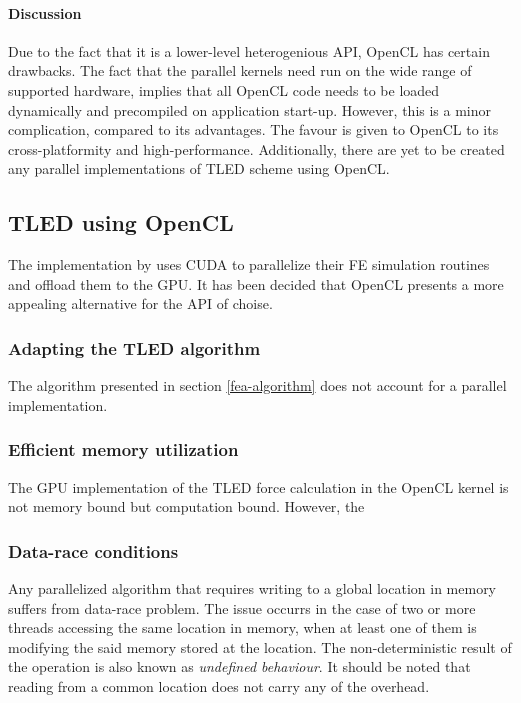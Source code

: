  \paragraph{Discussion} Due to the fact that it is a lower-level heterogenious API, OpenCL has certain drawbacks. The fact that the parallel kernels need run on the wide range of supported hardware, implies that all OpenCL code needs to be loaded dynamically and precompiled on application start-up. However, this is a minor complication, compared to its advantages. The favour is given to OpenCL to its cross-platformity and high-performance. Additionally, there are yet to be created any parallel implementations of TLED scheme using OpenCL.

\subsection{TLED using OpenCL}

  The implementation by \cite{Johnsen2014} uses CUDA to parallelize their FE simulation routines and offload them to the GPU. It has been decided that OpenCL presents a more appealing alternative for the API of choise.

  \subsubsection{Adapting the TLED algorithm}

  The algorithm presented in section \ref{fea-algorithm} does not account for a parallel implementation.

  \subsubsection{Efficient memory utilization}

  The GPU implementation of the TLED force calculation in the OpenCL kernel is not memory bound but computation bound. However, the

  \subsubsection{Data-race conditions}

  Any parallelized algorithm that requires writing to a global location in memory suffers from data-race problem. The issue occurrs in the case of two or more threads accessing the same location in memory, when at least one of them is modifying the said memory stored at the location. The non-deterministic result of the operation is also known as \textit{undefined behaviour}. It should be noted that reading from a common location does not carry any of the overhead.

